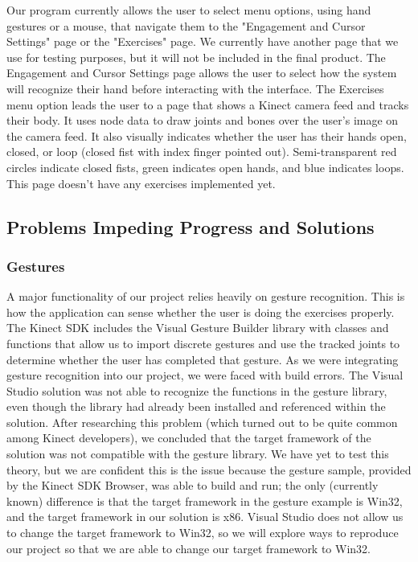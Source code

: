 \documentclass[onecolumn, draftclsnofoot,10pt, compsoc]{IEEEtran}
\begin{document}
Our program currently allows the user to select menu options, using hand gestures or a mouse, that navigate them to the "Engagement and Cursor Settings" page or the "Exercises" page. We currently have another page that we use for testing purposes, but it will not be included in the final product. The Engagement and Cursor Settings page allows the user to select how the system will recognize their hand before interacting with the interface. The Exercises menu option leads the user to a page that shows a Kinect camera feed and tracks their body. It uses node data to draw joints and bones over the user's image on the camera feed. It also visually indicates whether the user has their hands open, closed, or loop (closed fist with index finger pointed out). Semi-transparent red circles indicate closed fists, green indicates open hands, and blue indicates loops. This page doesn't have any exercises implemented yet.

\subsection{Problems Impeding Progress and Solutions}
\subsubsection{Gestures}
A major functionality of our project relies heavily on gesture recognition. This is how the application can sense whether the user is doing the exercises properly. The Kinect SDK includes the Visual Gesture Builder library with classes and functions that allow us to import discrete gestures and use the tracked joints to determine whether the user has completed that gesture\cite{Gestures}. As we were integrating gesture recognition into our project, we were faced with build errors. The Visual Studio solution was not able to recognize the functions in the gesture library, even though the library had already been installed and referenced within the solution. After researching this problem (which turned out to be quite common among Kinect developers), we concluded that the target framework of the solution was not compatible with the gesture library. We have yet to test this theory, but we are confident this is the issue because the gesture sample, provided by the Kinect SDK Browser, was able to build and run; the only (currently known) difference is that the target framework in the gesture example is Win32, and the target framework in our solution is x86. Visual Studio does not allow us to change the target framework to Win32, so we will explore ways to reproduce our project so that we are able to change our target framework to Win32.
\end{document}

